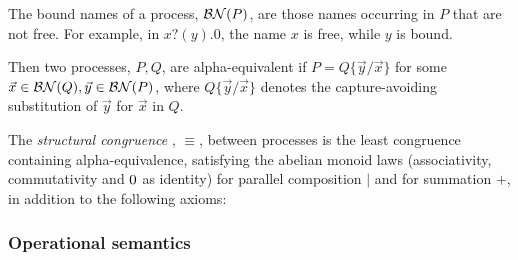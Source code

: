 
The bound names of a process, $\mathbin{\mathcal{BN}(P)}$, are those names occurring in $P$
that are not free. For example, in $x?(y).0$, the name $x$ is free, while $y$ is bound.

\begin{definition}
Then two processes, $P,Q$, are alpha-equivalent if $P = Q\{\vec{y}/\vec{x}\}$ for
some $\vec{x} \in \mathbin{\mathcal{BN}(Q)},\vec{y} \in \mathbin{\mathcal{BN}(P)}$, where $Q\{\vec{y}/\vec{x}\}$
denotes the capture-avoiding substitution of $\vec{y}$ for $\vec{x}$ in $Q$.
\end{definition}

\begin{definition}
  The {\em structural congruence} \cite{SangiorgiWalker} , $\equiv$, between processes is the
  least congruence containing alpha-equivalence, satisfying the
  abelian monoid laws (associativity, commutativity and $\mathbin{0}$ as
  identity) for parallel composition $|$ and for summation $+$, in addition to the
  following axioms:
\end{definition}

\subsubsection{Operational semantics} 

